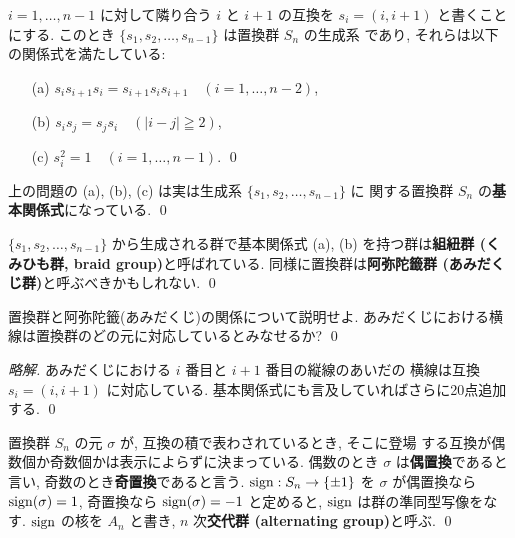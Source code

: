 \documentclass[12pt,twoside]{jarticle}
\newcommand\commentout[1]{#1}
\newcommand\commentout[1]{}
\begin{document}

\begin{question}
  $i=1,\dots,n-1$ に対して隣り合う $i$ と $i+1$ の互換を $s_i=(i,i+1)$ 
  と書くことにする.
  このとき $\{s_1,s_2,\ldots,s_{n-1}\}$ は置換群 $S_n$ の生成系
  であり, それらは以下の関係式を満たしている:
  \begin{itemize}
  \item[(a)] $s_is_{i+1}s_i = s_{i+1}s_is_{i+1} \quad (i=1,\dots,n-2)$,
  \item[(b)] $s_is_j=s_js_i \quad (|i-j|\geqq2)$,
  \item[(c)] $s_i^2 = 1 \quad (i=1,\dots,n-1)$.
  \qed
  \end{itemize}
\end{question}

\begin{rem}
  上の問題の (a), (b), (c) は実は生成系 $\{s_1,s_2,\dots,s_{n-1}\}$ に
  関する置換群 $S_n$ の{\bf 基本関係式}になっている. \qed
\end{rem}

\begin{rem}
 $\{s_1,s_2,\dots,s_{n-1}\}$ から生成される群で基本関係式 (a), (b)
 を持つ群は{\bf 組紐群 (くみひも群, braid group)}と呼ばれている. 
 同様に置換群は{\bf 阿弥陀籤群 (あみだくじ群)}と呼ぶべきかもしれない.
 \qed
\end{rem}


\begin{question}[10点]
  置換群と阿弥陀籤(あみだくじ)の関係について説明せよ. 
  あみだくじにおける横線は置換群のどの元に対応しているとみなせるか?
  \qed
\end{question}

\commentout{
\begin{proof}[略解]
  あみだくじにおける $i$ 番目と $i+1$ 番目の縦線のあいだの
  横線は互換 $s_i=(i,i+1)$ に対応している.
  基本関係式にも言及していればさらに20点追加する.
  \qed
\end{proof}
}


\begin{question}
  置換群 $S_n$ の元 $\sigma$ が, 互換の積で表わされているとき, そこに登場
  する互換が偶数個か奇数個かは表示によらずに決まっている. 
  偶数のとき $\sigma$ は{\bf 偶置換}であると言い, 
  奇数のとき{\bf 奇置換}であると言う. 
  $\mathop{\mathrm{sign}}\nolimits:S_n\to\{\pm1\}$ を $\sigma$ が偶置換なら $\mathop{\mathrm{sign}}\nolimits(\sigma)=1$,
  奇置換なら $\mathop{\mathrm{sign}}\nolimits(\sigma)=-1$ と定めると, $\mathop{\mathrm{sign}}\nolimits$ は群の準同型写像をなす.
  $\mathop{\mathrm{sign}}\nolimits$ の核を $A_n$ と書き, $n$ 次{\bf 交代群 (alternating group)}と呼ぶ. 
  \qed
\end{question}
\end{document}

